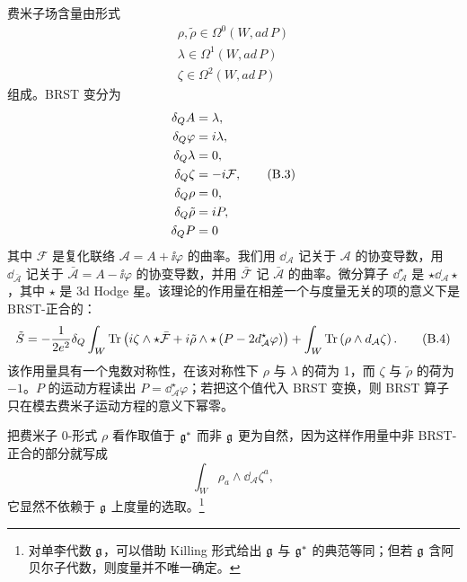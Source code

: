 费米子场含量由形式
\begin{gather*}
  \rho,\tilde\rho\in\Omega^0(W,\mathit{ad}\,P)\\
  \lambda\in\Omega^1(W,\mathit{ad}\,P)\\
  \zeta\in\Omega^2(W,\mathit{ad}\,P)
\end{gather*}
组成。BRST 变分为
\begin{align}
  \delta_QA &= \lambda, \notag\\
  \delta_Q\varphi &= i\lambda, \notag\\
  \delta_Q\lambda &= 0, \notag\\
  \delta_Q\zeta &= -i\mathcal{F}, \tag{B.3}\\
  \delta_Q\rho &= 0, \notag\\
  \delta_Q\tilde\rho &= i P, \notag\\
  \delta_QP &= 0 \notag
\end{align}
其中 $\mathcal{F}$ 是复化联络 $\mathcal{A}=A+\ii\varphi$ 的曲率。我们用 $\dd_{\mathcal A}$ 记关于 $\mathcal{A}$ 的协变导数，用 $\dd_{\bar{\mathcal A}}$ 记关于 $\bar{\mathcal A}=A-\ii\varphi$ 的协变导数，并用 $\bar{\mathcal F}$ 记 $\bar{\mathcal A}$ 的曲率。微分算子 $\dd^\star_{\mathcal A}$ 是 $\star\dd_{\mathcal A}\star$，其中 $\star$ 是 3d Hodge 星。该理论的作用量在相差一个与度量无关的项的意义下是 BRST-正合的：
\begin{equation}
  \tilde S=-\frac{1}{2e^2}\delta_Q\int_W\operatorname{Tr}\left(i\zeta\wedge\star\bar{\mathcal F}
  +i\tilde\rho\wedge\star\left(P-2d^\star_{\mathcal A}\varphi\right)\right)
  +\int_W\operatorname{Tr}\left(\rho\wedge d_{\mathcal A}\zeta\right). \tag{B.4}
\end{equation}
该作用量具有一个鬼数对称性，在该对称性下 $\rho$ 与 $\lambda$ 的荷为 1，而 $\zeta$ 与 $\tilde\rho$ 的荷为 $-1$。$P$ 的运动方程读出 $P=\dd^\star_{\mathcal A}\varphi$；若把这个值代入 BRST 变换，则 BRST 算子只在模去费米子运动方程的意义下幂零。

把费米子 0-形式 $\rho$ 看作取值于 $\mathfrak{g}^*$ 而非 $\mathfrak{g}$ 更为自然，因为这样作用量中非 BRST-正合的部分就写成
\[
  \int_W\rho_a\wedge\dd_{\mathcal A}\zeta^a,
\]
它显然不依赖于 $\mathfrak{g}$ 上度量的选取。\footnote{对单李代数 $\mathfrak{g}$，可以借助 Killing 形式给出 $\mathfrak{g}$ 与 $\mathfrak{g}^*$ 的典范等同；但若 $\mathfrak{g}$ 含阿贝尔子代数，则度量并不唯一确定。}


